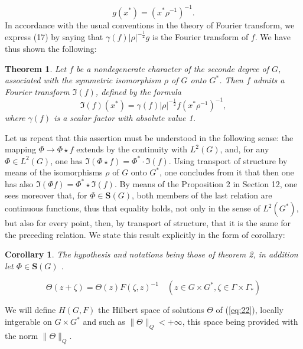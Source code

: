\documentclass[12pt]{amsart}
\newtheorem{thm}{Theorem}
\newtheorem{cor}{Corollary}
\newcounter{ssection}
\renewcommand{\subsection}{
  \addtocounter{ssection}{1}{\bf  \arabic{ssection}.\  }}
\begin{document}
\[
g(x^{*})=(x^{*}\rho^{-1})^{-1}.\]
 In accordance with the usual conventions in the theory of Fourier
transform, we express (17) by saying that $\gamma(f)|\rho|^{-\frac{1}{2}}g$
is the Fourier transform of $f$. We have thus shown the following: 
\begin{thm}
Let $f$ be a nondegenerate character of the seconde degree of $G$,
associated with the symmetric isomorphism $\rho$ of $G$ onto $G^{*}$.
Then $f$ admits a Fourier transform $\mathfrak{I}(f)$, defined by
the formula \[
\mathfrak{I}(f)(x^{*})=\gamma(f)|\rho|^{-\frac{1}{2}}f(x^{*}\rho^{-1})^{-1},\]
 where $\gamma(f)$ is a scalar factor with absolute value 1.
\end{thm}
Let us repeat that this assertion must be understood in the following
sense: the mapping $\Phi\to\Phi\star f$ extends by the continuity
with $L^{2}(G)$, and, for any $\Phi\in L^{2}(G)$, one has $\mathfrak{I}(\Phi\star f)=\Phi^{*}\cdot\mathfrak{I}(f)$.
Using transport of structure by means of the isomorphisms $\rho$
of $G$ onto $G^{*}$, one concludes from it that then one has also
$\mathfrak{I}(\Phi f)=\Phi^{*}\star\mathfrak{I}(f)$. By means of
the Proposition 2 in Section 12, one sees moreover that, for $\Phi\in\mathbf{S}(G)$,
both members of the last relation are continuous functions, thus that
equality holds, not only in the sense of $L^{2}(G^{*})$, but also
for every point, then, by transport of structure, that it is the same
for the preceding relation. We state this result explicitly in the
form of corollary: 
\begin{cor}
The hypothesis and notations being those of theorem 2, in addition
let $\Phi\in\mathbf{S}(G)$ .
\end{cor}

\setcounter{ssection}{16}
\subsection{}
\begin{equation}\label{eq:22}
\Theta(z+\zeta)=\Theta(z)F(\zeta,z)^{-1} 
\quad (z\in G\times G^*, \zeta \in \Gamma\times \Gamma_*)
\end{equation}

\subsection{}
We will define $H(G,F)$ the Hilbert space of solutions $\Theta$ of (\ref{eq:22}),
 locally intgerable on $G\times G^*$ 
and such as $\|\Theta\|_Q< +\infty$, this space being provided with the norm $\|\Theta\|_Q$.
\end{document}
